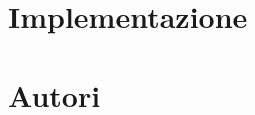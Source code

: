 \documentclass{llncs}
\newcommand{\labelsec}[1]{\label{sec:#1}}
\begin{document}
\section{Implementazione}
\labelsec{Implementation}
%
%
%
%
\newpage
\section{Autori}
\labelsec{Authors}
\end{document}
